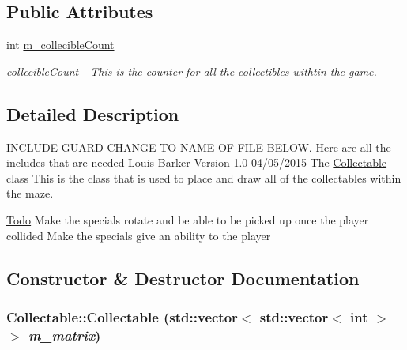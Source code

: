 \subsection*{Public Attributes}
\begin{DoxyCompactItemize}
\item 
\hypertarget{classCollectable_afeb033aeb156815a95b579e0dcb8e4ef}{
int \hyperlink{classCollectable_afeb033aeb156815a95b579e0dcb8e4ef}{m\_\-collecibleCount}}
\label{classCollectable_afeb033aeb156815a95b579e0dcb8e4ef}

\begin{DoxyCompactList}\small\item\em collecibleCount -\/ This is the counter for all the collectibles withtin the game. \item\end{DoxyCompactList}\end{DoxyCompactItemize}


\subsection{Detailed Description}
INCLUDE GUARD CHANGE TO NAME OF FILE BELOW. Here are all the includes that are needed Louis Barker Version 1.0 04/05/2015 The \hyperlink{classCollectable}{Collectable} class This is the class that is used to place and draw all of the collectables within the maze. \begin{Desc}
\item[\hyperlink{todo__todo000005}{Todo}]Make the specials rotate and be able to be picked up once the player collided Make the specials give an ability to the player \end{Desc}


\subsection{Constructor \& Destructor Documentation}
\hypertarget{classCollectable_a95cb1ed37d494d716bb386942d434845}{
\subsubsection[{Collectable}]{\setlength{\rightskip}{0pt plus 5cm}Collectable::Collectable (std::vector$<$ std::vector$<$ int $>$ $>$ {\em m\_\-matrix})}}
\label{classCollectable_a95cb1ed37d494d716bb386942d434845}



